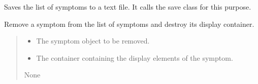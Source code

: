 \documentclass[letterpaper,10pt,english]{sphinxmanual}
\begin{document}
\begin{fulllineitems}

\begin{fulllineitems}
\label{\detokenize{general_interface:general_interface.InterfaceGenerale.sauvegarde}}
\pysigstartsignatures
{}
\pysigstopsignatures
\sphinxAtStartPar
Saves the list of symptoms to a text file.
It calls the save class for this purpose.

\end{fulllineitems}


\begin{fulllineitems}
\label{\detokenize{general_interface:general_interface.InterfaceGenerale.supprimer}}
\pysigstartsignatures
{}
\pysigstopsignatures
\sphinxAtStartPar
Remove a symptom from the list of symptoms and destroy its display container.
\begin{quote}\begin{description}
\begin{itemize}
\item {} 
\sphinxAtStartPar
{} \textendash{} The symptom object to be removed.

\item {} 
\sphinxAtStartPar
{} \textendash{} The container containing the display elements of the symptom.

\end{itemize}

\sphinxAtStartPar
None

\end{description}\end{quote}

\end{fulllineitems}



\end{fulllineitems}
\end{document}
